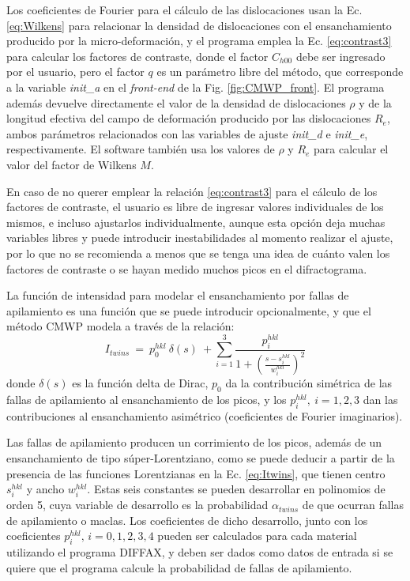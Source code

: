 Los coeficientes de Fourier para el cálculo de las dislocaciones usan la Ec. \ref{eq:Wilkens} para relacionar la densidad de dislocaciones con el ensanchamiento producido por la micro-deformación, y el programa emplea la Ec. \ref{eq:contrast3} para calcular los factores de contraste, donde el factor $C_{h00}$ debe ser ingresado por el usuario, pero el factor $q$ es un parámetro libre del método, que corresponde a la variable \textit{init\_a} en el \textit{front-end} de la Fig. \ref{fig:CMWP_front}.
El programa además devuelve directamente el valor de la densidad de dislocaciones $\rho$ y de la longitud efectiva del campo de deformación producido por las dislocaciones $R_e$, ambos parámetros relacionados con las variables de ajuste \textit{init\_d} e \textit{init\_e}, respectivamente. 
El software también usa los valores de $\rho$ y $R_e$ para calcular el valor del factor de Wilkens $M$.

En caso de no querer emplear la relación \ref{eq:contrast3} para el cálculo de los factores de contraste, el usuario es libre de ingresar valores individuales de los mismos, e incluso ajustarlos individualmente, aunque esta opción deja muchas variables libres y puede introducir inestabilidades al momento realizar el ajuste, por lo que no se recomienda a menos que se tenga una idea de cuánto valen los factores de contraste o se hayan medido muchos picos en el difractograma.

La función de intensidad para modelar el ensanchamiento por fallas de apilamiento es una función que se puede introducir opcionalmente, y que el método CMWP modela a través de la relación\cite{Ribarik2008}:
\begin{equation}
  I_{twins} \ = \ p_0^{hkl} \ \delta(s) \ + \sum_{i=1}^{3} \frac{p_{i}^{hkl}}{1+\left( \frac{s - s_i^{hkl}}{w_i^{hkl}} \right)^2}
  \label{eq:Itwins}
\end{equation}
\noindent
donde $\delta(s)$ es la función delta de Dirac, $p_0$ da la contribución simétrica de las fallas de apilamiento al ensanchamiento de los picos, y los $p_i^{hkl}, \ i=1,2,3$ dan las contribuciones al ensanchamiento asimétrico (coeficientes de Fourier imaginarios).

Las fallas de apilamiento producen un corrimiento de los picos, además de un ensanchamiento de tipo súper-Lorentziano, como se puede deducir a partir de la presencia de las funciones Lorentzianas en la Ec. \ref{eq:Itwins}, que tienen centro $s_i^{hkl}$ y ancho $w_i^{hkl}$.
Estas seis constantes se pueden desarrollar en polinomios de orden 5, cuya variable de desarrollo es la probabilidad $\alpha_{twins}$ de que ocurran fallas de apilamiento o maclas\cite{Ribarik2008}.
Los coeficientes de dicho desarrollo, junto con los coeficientes $p_i^{hkl},\,i=0,1,2,3,4$ pueden ser calculados para cada material utilizando el programa DIFFAX\cite{Treacy1991}, y deben ser dados como datos de entrada si se quiere que el programa calcule la probabilidad de fallas de apilamiento.

